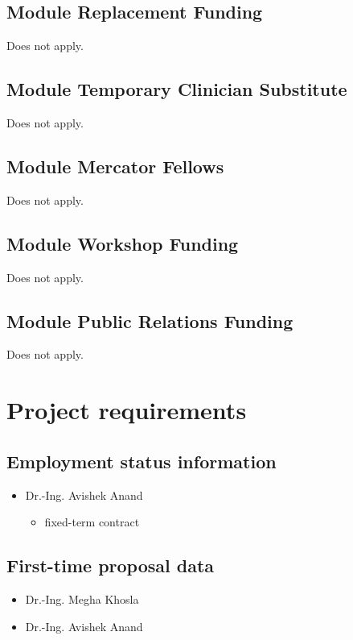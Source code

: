 \subsection{Module Replacement Funding}
Does not apply.
\subsection{Module Temporary Clinician Substitute}
Does not apply.
\subsection{Module Mercator Fellows}
Does not apply.
\subsection{Module Workshop Funding}
Does not apply.
\subsection{Module Public Relations Funding}
Does not apply.

\section{Project requirements}

\subsection{Employment status information}

	\begin{itemize}
	\item Dr.-Ing. Avishek Anand
		\begin{itemize}
		\item fixed-term contract
		\end{itemize}
	\end{itemize}

\subsection{First-time proposal data}
\begin{itemize}
	\item  Dr.-Ing. Megha Khosla%
	\item  Dr.-Ing. Avishek Anand%
	
\end{itemize}

